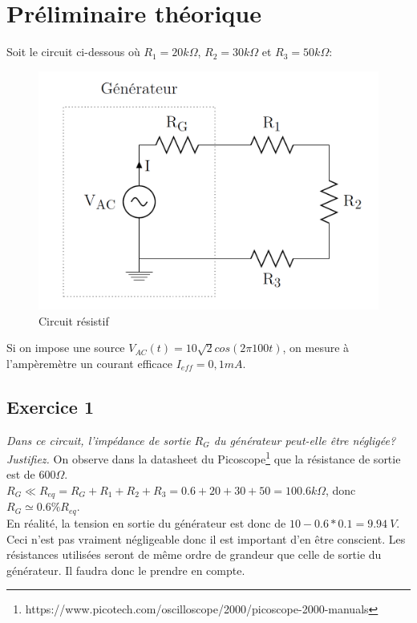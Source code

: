 \newpage

\section{Préliminaire théorique}
Soit le circuit ci-dessous où $R_1 = 20k\Omega$, $R_2 = 30k\Omega$ et $R_3 = 50k\Omega$:
\begin{center}
\begin{figure}[h!]
    \centering
    \includegraphics[scale = 0.7]{LABO1A/Ex1Lab1A.PNG}
    \caption{Circuit résistif}
    \label{fig:my_label}
\end{figure}
\end{center}
Si on impose une source $V_{AC}(t) = 10\sqrt{2} cos(2\pi 100t)$, on mesure à l'ampèremètre un courant efficace $I_{eff} = 0,1 mA$.

\subsection{Exercice 1}
\Question
{
\textit{Dans ce circuit, l'impédance de sortie $R_G$ du générateur peut-elle être négligée? Justifiez.}
}
{On observe dans la datasheet du Picoscope\footnote{https://www.picotech.com/oscilloscope/2000/picoscope-2000-manuals} que la résistance de sortie est de $600\Omega$.\\$R_G\ll R_{eq}=R_G+R_1+R_2+R_3=0.6+20+30+50=100.6 k\Omega$, donc $R_G\simeq 0.6\%R_{eq}$.\\
En réalité, la tension en sortie du générateur est donc de $10-0.6*0.1=9.94\ V$. Ceci n'est pas vraiment négligeable donc il est important d'en être conscient. Les résistances utilisées seront de même ordre de grandeur que celle de sortie du générateur. Il faudra donc le prendre en compte.}
